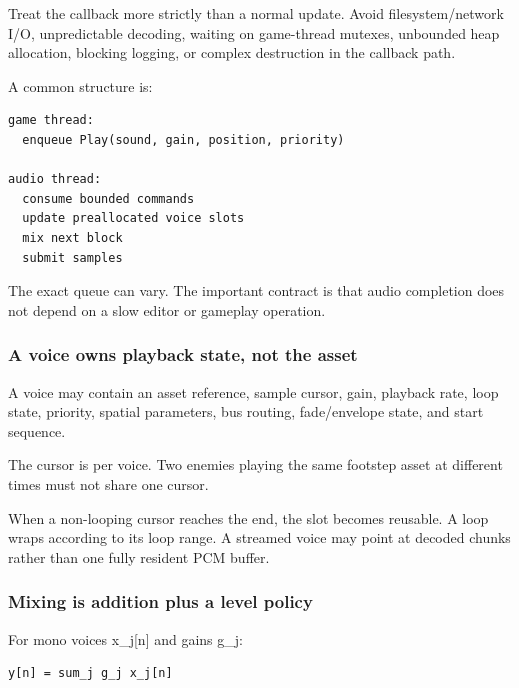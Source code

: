 Treat the callback more strictly than a normal update. Avoid filesystem/network I/O, unpredictable decoding, waiting on game-thread mutexes, unbounded heap allocation, blocking logging, or complex destruction in the callback path.

A common structure is:

\begin{verbatim}
game thread:
  enqueue Play(sound, gain, position, priority)

audio thread:
  consume bounded commands
  update preallocated voice slots
  mix next block
  submit samples
\end{verbatim}

The exact queue can vary. The important contract is that audio completion does not depend on a slow editor or gameplay operation.

\subsubsection{A voice owns playback state, not the asset}\label{05-engine-i-ch009-a-voice-owns-playback-state-not-the-asset}

\hypertarget{05-engine-i-ch009-a-voice-owns-playback-state-not-the-asset}{}

A voice may contain an asset reference, sample cursor, gain, playback rate, loop state, priority, spatial parameters, bus routing, fade/envelope state, and start sequence.

The cursor is per voice. Two enemies playing the same footstep asset at different times must not share one cursor.

When a non-looping cursor reaches the end, the slot becomes reusable. A loop wraps according to its loop range. A streamed voice may point at decoded chunks rather than one fully resident PCM buffer.

\subsubsection{Mixing is addition plus a level policy}\label{05-engine-i-ch009-mixing-is-addition-plus-a-level-policy}

\hypertarget{05-engine-i-ch009-mixing-is-addition-plus-a-level-policy}{}

For mono voices x\_j{[}n{]} and gains g\_j:

\begin{verbatim}
y[n] = sum_j g_j x_j[n]
\end{verbatim}


